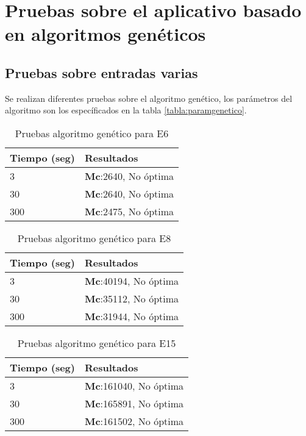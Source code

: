 \section{Pruebas sobre el aplicativo basado en algoritmos genéticos}

\subsection{Pruebas sobre entradas varias}

Se realizan diferentes pruebas sobre el algoritmo genético, los parámetros del algoritmo son los específicados en la tabla \ref{tabla:paramgenetico}.

\begin{center}
\begin{longtable}{|p{4cm}|p{13cm}|}
	\caption{Pruebas algoritmo genético para E6}\\
	\hline
	\cellcolor[gray]{0.9} \textbf{Tiempo (seg)} & \cellcolor[gray]{0.9}\textbf{Resultados} \\
	\hline
	3 & \textbf{Mc}:2640, No óptima\\
	\hline
	30 & \textbf{Mc}:2640, No óptima\\
	\hline
	300 & \textbf{Mc}:2475, No óptima\\
	\hline
\end{longtable}	
\end{center}

\begin{center}
\begin{longtable}{|p{4cm}|p{13cm}|}
	\caption{Pruebas algoritmo genético para E8}\\
	\hline
	\cellcolor[gray]{0.9} \textbf{Tiempo (seg)} & \cellcolor[gray]{0.9}\textbf{Resultados} \\
	\hline
	3 & \textbf{Mc}:40194, No óptima\\
	\hline
	30 &  \textbf{Mc}:35112, No óptima\\
	\hline
	300 & \textbf{Mc}:31944, No óptima\\
	\hline
\end{longtable}	
\end{center}

\begin{center}
\begin{longtable}{|p{4cm}|p{13cm}|}
	\caption{Pruebas algoritmo genético para E15}\\
	\hline
	\cellcolor[gray]{0.9} \textbf{Tiempo (seg)} & \cellcolor[gray]{0.9}\textbf{Resultados} \\
	\hline
	3 &  \textbf{Mc}:161040, No óptima\\
	\hline
	30 & \textbf{Mc}:165891, No óptima\\
	\hline
	300 &  \textbf{Mc}:161502, No óptima\\
	\hline
\end{longtable}	
\end{center}


